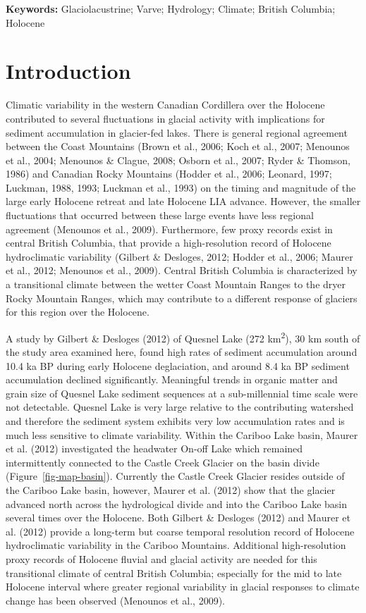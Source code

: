 \documentclass[
  letterpaper,
  DIV=11,
  numbers=noendperiod]{scrartcl}
\begin{document}
\textbf{Keywords:} Glaciolacustrine; Varve; Hydrology; Climate; British
Columbia; Holocene

\pagebreak

\hypertarget{introduction}{%
\section{Introduction}\label{introduction}}

Climatic variability in the western Canadian Cordillera over the
Holocene contributed to several fluctuations in glacial activity with
implications for sediment accumulation in glacier-fed lakes. There is
general regional agreement between the Coast Mountains (Brown et al.,
2006; Koch et al., 2007; Menounos et al., 2004; Menounos \& Clague,
2008; Osborn et al., 2007; Ryder \& Thomson, 1986) and Canadian Rocky
Mountains (Hodder et al., 2006; Leonard, 1997; Luckman, 1988, 1993;
Luckman et al., 1993) on the timing and magnitude of the large early
Holocene retreat and late Holocene LIA advance. However, the smaller
fluctuations that occurred between these large events have less regional
agreement (Menounos et al., 2009). Furthermore, few proxy records exist
in central British Columbia, that provide a high-resolution record of
Holocene hydroclimatic variability (Gilbert \& Desloges, 2012; Hodder et
al., 2006; Maurer et al., 2012; Menounos et al., 2009). Central British
Columbia is characterized by a transitional climate between the wetter
Coast Mountain Ranges to the dryer Rocky Mountain Ranges, which may
contribute to a different response of glaciers for this region over the
Holocene.

A study by Gilbert \& Desloges (2012) of Quesnel Lake (272
km\textsuperscript{2}), 30 km south of the study area examined here,
found high rates of sediment accumulation around 10.4 ka BP during early
Holocene deglaciation, and around 8.4 ka BP sediment accumulation
declined significantly. Meaningful trends in organic matter and grain
size of Quesnel Lake sediment sequences at a sub-millennial time scale
were not detectable. Quesnel Lake is very large relative to the
contributing watershed and therefore the sediment system exhibits very
low accumulation rates and is much less sensitive to climate
variability. Within the Cariboo Lake basin, Maurer et al. (2012)
investigated the headwater On-off Lake which remained intermittently
connected to the Castle Creek Glacier on the basin divide
(Figure~\ref{fig-map-basin}). Currently the Castle Creek Glacier resides
outside of the Cariboo Lake basin, however, Maurer et al. (2012) show
that the glacier advanced north across the hydrological divide and into
the Cariboo Lake basin several times over the Holocene. Both Gilbert \&
Desloges (2012) and Maurer et al. (2012) provide a long-term but coarse
temporal resolution record of Holocene hydroclimatic variability in the
Cariboo Mountains. Additional high-resolution proxy records of Holocene
fluvial and glacial activity are needed for this transitional climate of
central British Columbia; especially for the mid to late Holocene
interval where greater regional variability in glacial responses to
climate change has been observed (Menounos et al., 2009).
\end{document}
